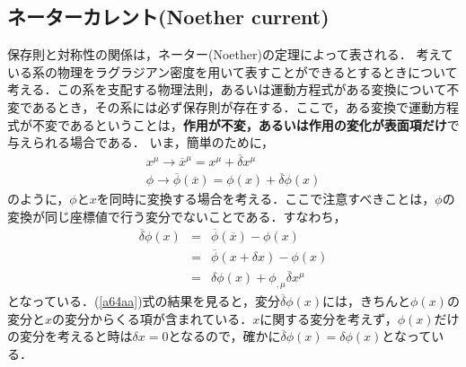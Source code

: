 \subsection{ネーターカレント(Noether current)}
保存則と対称性の関係は，ネーター(Noether)の定理によって表される．
考えている系の物理をラグラジアン密度を用いて表すことができるとするときについて考える．この系を支配する物理法則，あるいは運動方程式がある変換について不変であるとき，その系には必ず保存則が存在する．ここで，ある変換で運動方程式が不変であるということは，\textbf{作用が不変，あるいは作用の変化が表面項だけ}で与えられる場合である．
いま，簡単のために，
\begin{eqnarray}
\label{xn}
&x^{\mu}\rightarrow \overline{x}^{\mu}={x}^{\mu}+\overline{\delta}x^{\mu}& \\
\label{pn}
&\phi\rightarrow\overline{\phi}(\overline{x})=\phi(x)+\overline{\delta}\phi(x)&
\end{eqnarray}
のように，$\phi$と$x$を同時に変換する場合を考える．ここで注意すべきことは，$\phi$の変換が同じ座標値で行う変分でないことである．すなわち，
\begin{eqnarray}
\label{a64aa}
\overline{\delta}\phi(x)&=&\overline{\phi}(\overline{x})-\phi(x) \nonumber \\
&=&\overline\phi(x+\delta x)-\phi(x) \nonumber \\
&=&\delta\phi(x)+\phi_{,\mu}\overline{\delta}x^{\mu}
\end{eqnarray}
となっている．(\ref{a64aa})式の結果を見ると，変分$\overline{\delta}\phi(x)$には，きちんと$\phi(x)$の変分と$x$の変分からくる項が含まれている．$x$に関する変分を考えず，$\phi(x)$だけの変分を考えると時は$\delta x=0$となるので，確かに$\overline{\delta}\phi(x)=\delta\phi(x)$となっている．

